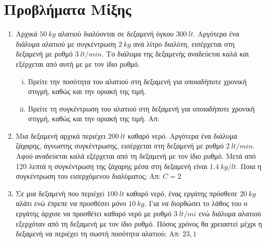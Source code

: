 \section*{Προβλήματα Μίξης}

\begin{enumerate}
  \item Αρχικά $ \SI{50}{kg} $ αλατιού διαλύονται σε δεξαμενή όγκου 
    $ \SI{300}{lt} $.  Αργότερα ένα διάλυμα αλατιού με συγκέντρωση 
    $ \SI{2}{kg} $ ανά λίτρο διαλύτη, εισέρχεται στη δεξαμενή με ρυθμό 
    $ \SI{3}{lt/min} $. Το διάλυμα της δεξαμενής αναδεύεται καλά και εξέρχεται από 
    αυτή με με τον ίδιο ρυθμό.
    \begin{enumerate}[i)]
      \item Βρείτε την ποσότητα του αλατιού στη δεξαμενή για οποιαδήποτε χρονική 
        στιγμή, καθώς και την οριακή της τιμή.
      \item Βρείτε τη συγκέντρωση του αλατιού στη δεξαμενή για οποιαδήποτε χρονική 
        στιγμή, καθώς και την οριακή της τιμή.
    \hfill Απ: 
    \end{enumerate}

  \item Μια δεξαμενή αρχικά περιέχει $ \SI{200}{lt} $ καθαρό νερό. Αργότερα ένα διάλυμα 
    ζάχαρης, άγνωστης συγκέντρωσης, εισέρχεται στη δεξαμενή με ρυθμό $ \SI{2}{lt/min} $. 
    Αφού αναδεύεται καλά εξέρχεται από τη δεξαμενή με τον ίδιο ρυθμό. 
    Μετά από 120 λεπτά η συγκέντρωση της ζάχαρης μέσα στη δεξαμενή είναι 
    $ \SI{1,4}{kg/lt} $. Ποια η συγκέντρωση του εισερχόμενου διαλύματος; 
    \hfill Απ: $ C=2 $

  \item Σε μια δεξαμενή που περιέχεi $ \SI{100}{lt} $ καθαρό νερό, ένας εργάτης πρόσθεσε 
    $ \SI{20}{kg} $ αλάτι ενώ έπρεπε να προσθέσει μόνο $ \SI{10}{kg} $. Για να διορθώσει 
    το λάθος του ο εργάτης άρχισε να προσθέτει καθαρό νερό με ρυθμό $ \SI{3}{lt/mi} $ 
    ενώ διάλυμα αλατιού εξερχόταν από τη δεξαμενή με τον ίδιο ρυθμό. Πόσος χρόνος θα
    χρειαστεί μέχρι η δεξαμενή να περιέχει τη σωστή ποσότητα αλατιού;
    \hfill Απ: $ 23,1 $ 
\end{enumerate}


